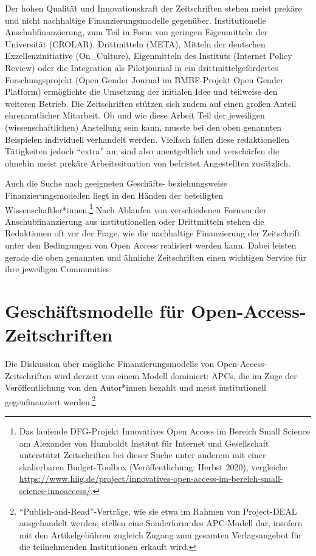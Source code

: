 \documentclass[a4paper,
fontsize=11pt,
oneside,
numbers=noperiodatend,
parskip=half-,
bibliography=totoc,
final
]{scrartcl}
\begin{document}
Der hohen Qualität und Innovationskraft der Zeitschriften stehen meist
prekäre und nicht nachhaltige Finanzierungsmodelle gegenüber.
Institutionelle Anschubfinanzierung, zum Teil in Form von geringen
Eigenmitteln der Universität (CROLAR), Drittmitteln (META), Mitteln der
deutschen Exzellenzinitiative (On\_Culture), Eigenmitteln des Instituts
(Internet Policy Review) oder die Integration als Pilotjournal in ein
drittmittelgefördertes Forschungsprojekt (Open Gender Journal im
BMBF-Projekt Open Gender Platform) ermöglichte die Umsetzung der
initialen Idee und teilweise den weiteren Betrieb. Die Zeitschriften
stützen sich zudem auf einen großen Anteil ehrenamtlicher Mitarbeit. Ob
und wie diese Arbeit Teil der jeweiligen (wissenschaftlichen) Anstellung
sein kann, musste bei den oben genannten Beispielen individuell
verhandelt werden. Vielfach fallen diese redaktionellen Tätigkeiten
jedoch \enquote{extra} an, sind also unentgeltlich und verschärfen die
ohnehin meist prekäre Arbeitssituation von befristet Angestellten
zusätzlich.

Auch die Suche nach geeigneten Geschäfts- beziehungsweise
Finanzierungsmodellen liegt in den Händen der beteiligten
Wissenschaftler*innen.\footnote{Das laufende DFG-Projekt Innovatives
  Open Access im Bereich Small Science am Alexander von Humboldt
  Institut für Internet und Gesellschaft unterstützt Zeitschriften bei
  dieser Suche unter anderem mit einer skalierbaren Budget-Toolbox
  (Veröffentlichung: Herbst 2020), vergleiche
  \url{https://www.hiig.de/project/innovatives-open-access-im-bereich-small-science-innoaccess/}.}
Nach Ablaufen von verschiedenen Formen der Anschubfinanzierung aus
institutionellen oder Drittmitteln stehen die Redaktionen oft vor der
Frage, wie die nachhaltige Finanzierung der Zeitschrift unter den
Bedingungen von Open Access realisiert werden kann. Dabei leisten gerade
die oben genannten und ähnliche Zeitschriften einen wichtigen Service
für ihre jeweiligen Communities.

\hypertarget{geschuxe4ftsmodelle-fuxfcr-open-access-zeitschriften}{%
\section*{Geschäftsmodelle für
Open-Access-Zeitschriften}\label{geschuxe4ftsmodelle-fuxfcr-open-access-zeitschriften}}

Die Diskussion über mögliche Finanzierungsmodelle von
Open-Access-Zeitschriften wird derzeit von einem Modell dominiert: APCs,
die im Zuge der Veröffentlichung von den Autor*innen bezahlt und meist
institutionell gegenfinanziert werden.\footnote{\enquote{Publish-and-Read}-Verträge,
  wie sie etwa im Rahmen von Project-DEAL ausgehandelt werden, stellen
  eine Sonderform des APC-Modell dar, insofern mit den Artikelgebühren
  zugleich Zugang zum gesamten Verlagsangebot für die teilnehmenden
  Institutionen erkauft wird.}
\end{document}
